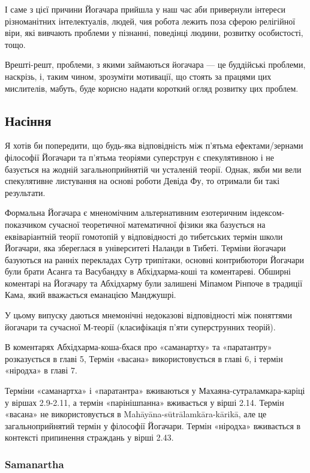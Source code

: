 І саме з цієї причини Йогачара прийшла у наш час аби привернули
інтереси різноманітних інтелектуалів, людей, чия робота лежить
поза сферою релігійної віри, які вивчають проблеми у пізнанні,
поведінці людини, розвитку особистості, тощо.

Врешті-решт, проблеми, з якими займаються йогачара --- це буддійські
проблеми, наскрізь, і, таким чином, зрозуміти мотивації, що стоять
за працями цих мислителів, мабуть, буде корисно надати короткий
огляд розвитку цих проблем.

\newpage
\subsection*{Насіння}

Я хотів би попередити, що будь-яка відповідність між п'ятьма ефектами/зернами
філософії Йогачари та п'ятьма теоріями суперструн є спекулятивною і не
базується на жодній загальноприйнятій чи усталеній теорії. Однак, якби
ми вели спекулятивне листування на основі роботи Девіда Фу, то отримали
би такі результати.

Формальна Йогачара є мненомічним альтернативним езотеричним
індексом-показчиком сучасної теоретичної математичної фізики
яка базується на еквіваріантній теорії гомотопій у відповідності
до тибетських термін школи Йогачари, яка збереглася в університеті
Наланди в Тибеті. Терміни йогачари базуються на ранніх перекладах
Сутр трипітаки, основні контрибютори Йогачари були брати Асанга та
Васубандху в Абхідхарма-коші та коментареві. Обширні коментарі на
Йогачару та Абхідхарму були залишені Міпамом Рінпоче в традиції Кама,
який вважається еманацією Манджушрі.

У цьому випуску даються мнемонічні недоказові відповідності між
поняттями йогачари та сучасної М-теорії (класифікація п'яти суперструнних теорій).

В коментарях Абхідхарма-коша-бхася про «саманартху» та «паратантру»
розказується в главі 5, Термін «васана» використовується в главі 6,
і термін «ніродха» в главі 7.

Терміни «саманартха» і «паратантра» вживаються у Махаяна-сутраламкара-каріці
у віршах 2.9-2.11, а термін «парінішпанна» вживається у вірші 2.14.
Термін «васана» не використовується в Mahāyāna-sūtrālamkāra-kārikā,
але це загальноприйнятий термін у філософії Йогачари. Термін «ніродха»
вживається в контексті припинення страждань у вірші 2.43.

\newpage
\subsubsection*{Samanartha}

